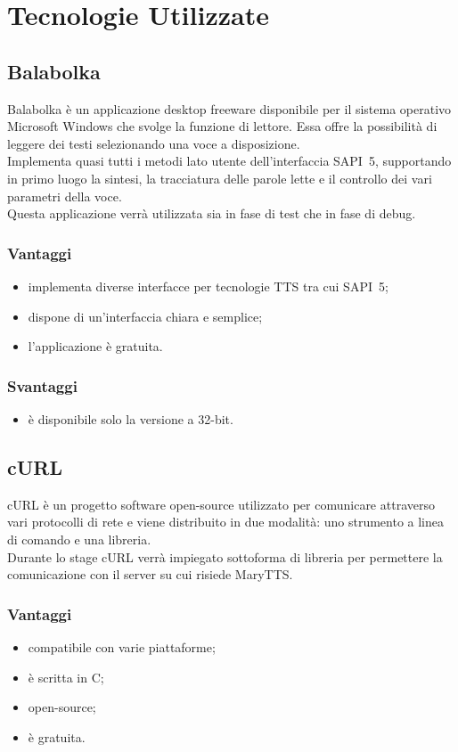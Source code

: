 \chapter{Tecnologie Utilizzate} %
\thispagestyle{empty}

\newpage
\section{Balabolka}
Balabolka è un applicazione desktop freeware disponibile per il sistema operativo Microsoft Windows che svolge la funzione di lettore. Essa offre la possibilità di leggere dei testi selezionando una voce a disposizione.\\
Implementa quasi tutti i metodi lato utente dell'interfaccia SAPI~5, supportando in primo luogo la sintesi, la tracciatura delle parole lette e il controllo dei vari parametri della voce.\\
Questa applicazione verrà utilizzata sia in fase di test che in fase di debug.
\subsection*{Vantaggi}
\begin{itemize}
	\item implementa diverse interfacce per tecnologie TTS tra cui SAPI~5;
	\item dispone di un'interfaccia chiara e semplice;
	\item l'applicazione è gratuita.
\end{itemize}
\subsection*{Svantaggi}
\begin{itemize}
	\item è disponibile solo la versione a 32-bit.
\end{itemize}

\section{cURL}
cURL è un progetto software open-source utilizzato per comunicare attraverso vari protocolli di rete e viene distribuito in due modalità: uno strumento a linea di comando e una libreria.\\
Durante lo stage cURL verrà impiegato sottoforma di libreria per permettere la comunicazione con il server su cui risiede MaryTTS.
\subsection*{Vantaggi}
\begin{itemize}
	\item compatibile con varie piattaforme;
	\item è scritta in C;
	\item open-source;
	\item è gratuita.
\end{itemize}
